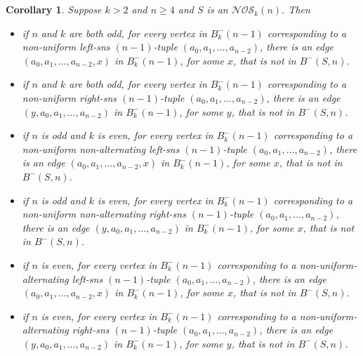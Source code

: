 \documentclass[10pt,a4paper]{amsart}
\newtheorem{corollary}{Corollary}
\begin{document}
\begin{corollary}  \label{corollary:NOS_excluded_tuples_by_unequal_degree}
Suppose $k>2$ and $n\geq4$ and $S$ is an $\mathcal{NOS}_k(n)$. Then
\begin{itemize}
\item[i)] if $n$ and $k$ are both odd, for every vertex in $B^-_k(n-1)$ corresponding to a
    non-uniform left-sns $(n-1)$-tuple $(a_0,a_1,\ldots,a_{n-2})$, there is an edge
    $(a_0,a_1,\ldots,a_{n-2},x)$ in $B^-_k(n-1)$, for some $x$, that is not in $B^-(S,n)$.
\item[ii)] if $n$ and $k$ are both odd, for every vertex in $B^-_k(n-1)$ corresponding to a
    non-uniform right-sns $(n-1)$-tuple $(a_0,a_1,\ldots,a_{n-2})$, there is an edge
    $(y,a_0,a_1,\ldots,a_{n-2})$ in $B^-_k(n-1)$, for some $y$, that is not in $B^-(S,n)$.
\item[iii)] if $n$ is odd and $k$ is even, for every vertex in $B^-_k(n-1)$ corresponding to a
    non-uniform non-alternating left-sns $(n-1)$-tuple $(a_0,a_1,\ldots,a_{n-2})$, there is an
    edge $(a_0,a_1,\ldots,a_{n-2},x)$ in $B^-_k(n-1)$, for some $x$, that is not in $B^-(S,n)$.
\item[iv)] if $n$ is odd and $k$ is even, for every vertex in $B^-_k(n-1)$ corresponding to a
    non-uniform non-alternating right-sns $(n-1)$-tuple $(a_0,a_1,\ldots,a_{n-2})$, there is an
    edge $(y,a_0,a_1,\ldots,a_{n-2})$ in $B^-_k(n-1)$, for some $x$, that is not in $B^-(S,n)$.
\item[v)] if $n$ is even, for every vertex in $B^-_k(n-1)$ corresponding to a
    non-uniform-alternating left-sns $(n-1)$-tuple $(a_0,a_1,\ldots,a_{n-2})$, there is an edge
    $(a_0,a_1,\ldots,a_{n-2},x)$ in $B^-_k(n-1)$, for some $x$, that is not in $B^-(S,n)$.
\item[vi)] if $n$ is even, for every vertex in $B^-_k(n-1)$ corresponding to a
    non-uniform-alternating right-sns $(n-1)$-tuple $(a_0,a_1,\ldots,a_{n-2})$, there is an
    edge $(y,a_0,a_1,\ldots,a_{n-2})$ in $B^-_k(n-1)$, for some $y$, that is not in $B^-(S,n)$.
\end{itemize}
\end{corollary}
\end{document}
